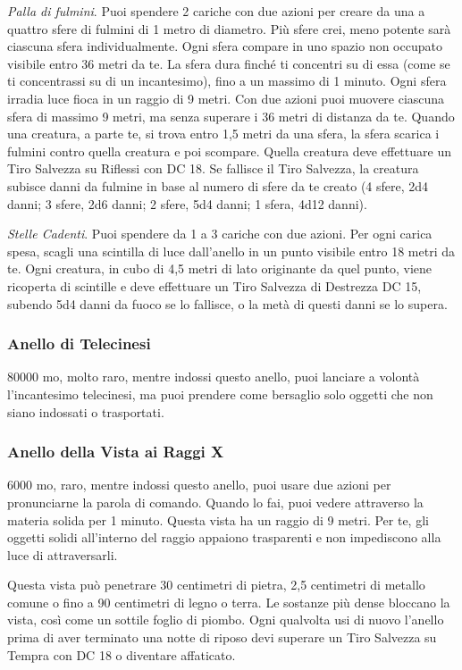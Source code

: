 \begin{multicols}{2}
	\textit{Palla di fulmini}. Puoi spendere 2 cariche con due azioni per creare da una a quattro sfere di fulmini di 1 metro di diametro. Più sfere crei, meno potente sarà ciascuna sfera individualmente.
	Ogni sfera compare in uno spazio non occupato visibile entro 36 metri da te. La sfera dura finché ti concentri su di essa (come se ti concentrassi su di un incantesimo), fino a un massimo di 1 minuto. Ogni sfera irradia luce fioca in un raggio di 9 metri. Con due azioni puoi muovere ciascuna sfera di massimo 9 metri, ma senza superare i 36 metri di distanza da te. Quando una creatura, a parte te, si trova entro 1,5 metri da una sfera, la sfera scarica i fulmini contro quella creatura e poi scompare. Quella creatura deve effettuare un Tiro Salvezza su Riflessi con DC 18. Se fallisce il Tiro Salvezza, la creatura subisce danni da fulmine in base al numero di sfere da te creato (4 sfere, 2d4 danni; 3 sfere, 2d6 danni; 2 sfere, 5d4 danni; 1 sfera, 4d12 danni).

	\textit{Stelle Cadenti}. Puoi spendere da 1 a 3 cariche con due azioni. Per ogni carica spesa, scagli una scintilla di luce dall'anello in un punto visibile entro 18 metri da te. Ogni creatura, in cubo di 4,5 metri di lato originante da quel punto, viene ricoperta di scintille e deve effettuare un Tiro Salvezza di Destrezza DC 15, subendo 5d4 danni da fuoco se lo fallisce, o la metà di questi danni se lo supera.

	\subsubsection*{Anello di Telecinesi}
	80000 mo, molto raro, mentre indossi questo anello, puoi lanciare a volontà l'incantesimo telecinesi, ma puoi prendere come bersaglio solo oggetti che non siano indossati o trasportati.

	\subsubsection*{Anello della Vista ai Raggi X}
	6000 mo, raro, mentre indossi questo anello, puoi usare due azioni per pronunciarne la parola di comando. Quando lo fai, puoi vedere attraverso la materia solida per 1 minuto. Questa vista ha un raggio di 9 metri. Per te, gli oggetti solidi all'interno del raggio appaiono trasparenti e non impediscono alla luce di attraversarli.

	Questa vista può penetrare 30 centimetri di pietra, 2,5 centimetri di metallo comune o fino a 90 centimetri di legno o terra. Le sostanze più dense bloccano la vista, così come un sottile foglio di piombo. Ogni qualvolta usi di nuovo l'anello prima di aver terminato una notte di riposo devi superare un Tiro Salvezza su Tempra con DC 18 o diventare affaticato.


\end{multicols}
